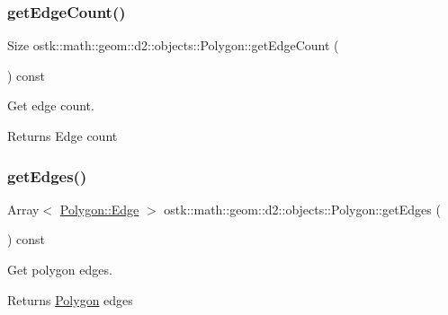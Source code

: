 \subsubsection{\texorpdfstring{get\+Edge\+Count()}{getEdgeCount()}}
{\footnotesize\ttfamily Size ostk\+::math\+::geom\+::d2\+::objects\+::\+Polygon\+::get\+Edge\+Count (\begin{DoxyParamCaption}{ }\end{DoxyParamCaption}) const}



Get edge count. 

\begin{DoxyReturn}{Returns}
Edge count 
\end{DoxyReturn}
\mbox{\label{classostk_1_1math_1_1geom_1_1d2_1_1objects_1_1_polygon_ac0c151b62ba0798eb4d86b2458e6d8b0}} 
\subsubsection{\texorpdfstring{get\+Edges()}{getEdges()}}
{\footnotesize\ttfamily Array$<$ \hyperlink{classostk_1_1math_1_1geom_1_1d2_1_1objects_1_1_polygon_a85e5c92944c126a62464874b5a6ba490}{Polygon\+::\+Edge} $>$ ostk\+::math\+::geom\+::d2\+::objects\+::\+Polygon\+::get\+Edges (\begin{DoxyParamCaption}{ }\end{DoxyParamCaption}) const}



Get polygon edges. 

\begin{DoxyReturn}{Returns}
\hyperlink{classostk_1_1math_1_1geom_1_1d2_1_1objects_1_1_polygon}{Polygon} edges 
\end{DoxyReturn}
\mbox{\label{classostk_1_1math_1_1geom_1_1d2_1_1objects_1_1_polygon_af1974ca25ea35ce4857dcac525f1180c}} 
